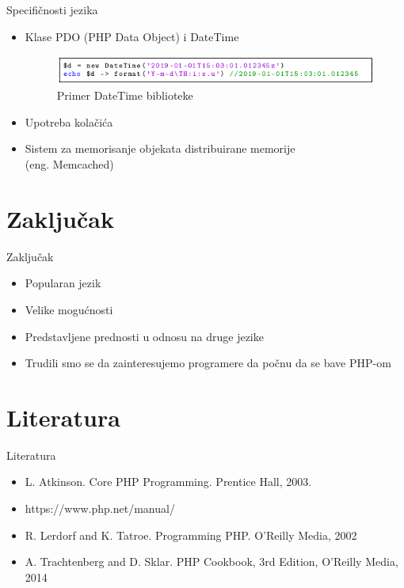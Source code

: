 \documentclass{beamer}
\begin{document}
\begin{frame}{Specifičnosti jezika}
    \begin{itemize}
        \item Klase PDO (PHP Data Object) i DateTime
        
        \begin{figure}[h!]
        \begin{center}
        \includegraphics[scale=0.45]{datetime.png}
        \end{center}
        \caption{Primer DateTime biblioteke}
        \label{fig:datetime}
        \end{figure}
        
        \item Upotreba kolačića
        \item Sistem za memorisanje objekata distribuirane memorije \\ (eng. Memcached)
    \end{itemize}
\end{frame}


\section{Zaključak}
\begin{frame}{Zaključak}
    \begin{itemize}
    \item Popularan jezik
    \item Velike mogućnosti 
    \item Predstavljene prednosti u odnosu na druge jezike
    \item Trudili smo se da zainteresujemo programere da počnu da se bave PHP-om
    \end{itemize}
\end{frame}


\section{Literatura}
\begin{frame}{Literatura}
    \begin{itemize}
        \item L. Atkinson. Core PHP Programming. Prentice Hall, 2003.
        \item https://www.php.net/manual/
        \item R. Lerdorf and K. Tatroe. Programming PHP. O'Reilly Media, 2002
        \item A. Trachtenberg and D. Sklar. PHP Cookbook, 3rd Edition,  O'Reilly Media, 2014
    \end{itemize}
\end{frame}
\end{document}
